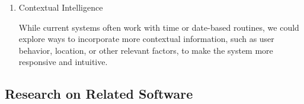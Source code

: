 \documentclass[conference]{IEEEtran}
\begin{document}
\begin{enumerate}[label=\arabic*]
\begin{enumerate}[label=\arabic*)]
        \vspace{0.5em}

        \item Contextual Intelligence\par
        \vspace{0.3em}
        While current systems often work with time or date-based routines, we could explore ways to incorporate more contextual information, such as user behavior, location, or other relevant factors, to make the system more responsive and intuitive.
    \end{enumerate}
\end{enumerate}

\vspace{0.7em} %

\subsection{Research on Related Software}
\vspace{0.5em}
\end{document}
